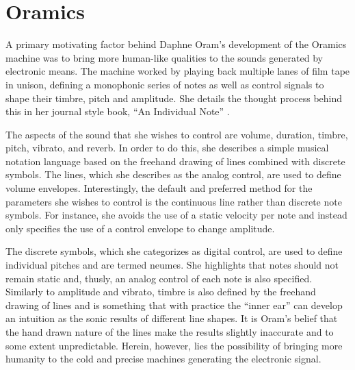 \documentclass[12pt]{report}
\begin{document}
\section{Oramics}
\label{sec:orgd7f5284}
A primary motivating factor behind Daphne Oram's development of the Oramics
machine was to bring more human-like qualities to the sounds generated by
electronic means. The machine worked by playing back multiple lanes of film tape
in unison, defining a monophonic series of notes as well as control signals to
shape their timbre, pitch and amplitude. She details the thought process behind
this in her journal style book, ``An Individual Note''
\cite{oram_individual_1972}.

The aspects of the sound that she wishes to control are volume, duration,
timbre, pitch, vibrato, and reverb. In order to do this, she describes a simple
musical notation language based on the freehand drawing of lines combined with
discrete symbols. The lines, which she describes as the analog control, are used
to define volume envelopes. Interestingly, the default and preferred method for
the parameters she wishes to control is the continuous line rather than discrete
note symbols. For instance, she avoids the use of a static velocity per note and
instead only specifies the use of a control envelope to change amplitude.

The discrete symbols, which she categorizes as digital control, are used to
define individual pitches and are termed neumes. She highlights that notes
should not remain static and, thusly, an analog control of each note is also
specified. Similarly to amplitude and vibrato, timbre is also defined by the
freehand drawing of lines and is something that with practice the ``inner ear''
can develop an intuition as the sonic results of different line shapes. It is
Oram's belief that the hand drawn nature of the lines make the results slightly
inaccurate and to some extent unpredictable. Herein, however, lies the
possibility of bringing more humanity to the cold and precise machines
generating the electronic signal.
\end{document}
